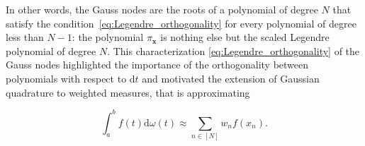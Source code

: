 \documentclass[twoside,11pt]{book}
\numberwithin{theorem}{chapter}
\numberwithin{definition}{chapter}
\numberwithin{proposition}{chapter}
\numberwithin{corollary}{chapter}
\numberwithin{example}{chapter}
\numberwithin{lemma}{chapter}
\numberwithin{assumption}{chapter}
\begin{document}

 In other words, the Gauss nodes are the roots of a polynomial of degree $N$ that satisfy the condition~\eqref{eq:Legendre_orthogonality} for every polynomial of degree less than $N-1$: the polynomial $\pi_{\bm{x}}$ is nothing else but the scaled Legendre polynomial of degree $N$.
 This characterization \eqref{eq:Legendre_orthogonality} of the Gauss nodes highlighted the importance of the orthogonality between polynomials with respect to $\mathrm{d}t$ and motivated the extension of Gaussian quadrature to weighted measures, that is approximating

\begin{equation}
\int_{a}^{b}f(t)\mathrm{d}\omega(t) \approx \sum\limits_{n \in [N]} w_{n}f(x_{n}).
\end{equation}

\end{document}

